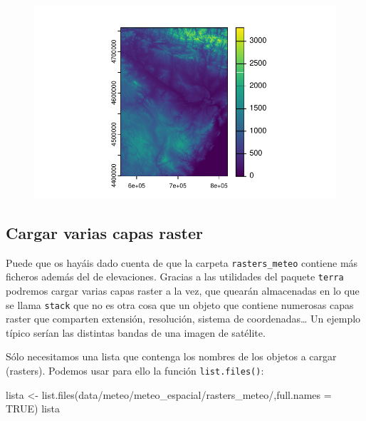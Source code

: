 \documentclass[
  letterpaper,
  DIV=11,
  numbers=noendperiod]{scrreprt}
\newenvironment{Shaded}{\begin{snugshade}}{\end{snugshade}}
\newcommand{\AttributeTok}[1]{\textcolor[rgb]{0.40,0.45,0.13}{#1}}
\newcommand{\ConstantTok}[1]{\textcolor[rgb]{0.56,0.35,0.01}{#1}}
\newcommand{\FunctionTok}[1]{\textcolor[rgb]{0.28,0.35,0.67}{#1}}
\newcommand{\NormalTok}[1]{\textcolor[rgb]{0.00,0.23,0.31}{#1}}
\newcommand{\OtherTok}[1]{\textcolor[rgb]{0.00,0.23,0.31}{#1}}
\newcommand{\StringTok}[1]{\textcolor[rgb]{0.13,0.47,0.30}{#1}}
\begin{document}
\begin{figure}[H]

{\centering \includegraphics{03_DatosEspaciales_files/figure-pdf/unnamed-chunk-25-1.pdf}

}

\end{figure}

\hypertarget{cargar-varias-capas-raster}{%
\subsection{Cargar varias capas
raster}\label{cargar-varias-capas-raster}}

Puede que os hayáis dado cuenta de que la carpeta
\texttt{rasters\_meteo} contiene más ficheros además del de elevaciones.
Gracias a las utilidades del paquete \texttt{terra} podremos cargar
varias capas raster a la vez, que quearán almacenadas en lo que se llama
\texttt{stack} que no es otra cosa que un objeto que contiene numerosas
capas raster que comparten extensión, resolución, sistema de
coordenadas\ldots{} Un ejemplo típico serían las distintas bandas de una
imagen de satélite.

Sólo necesitamos una lista que contenga los nombres de los objetos a
cargar (rasters). Podemos usar para ello la función
\texttt{list.files()}:

\begin{Shaded}
\begin{Highlighting}[]
\NormalTok{lista }\OtherTok{\textless{}{-}} \FunctionTok{list.files}\NormalTok{(}\StringTok{\textquotesingle{}data/meteo/meteo\_espacial/rasters\_meteo/\textquotesingle{}}\NormalTok{,}\AttributeTok{full.names =} \ConstantTok{TRUE}\NormalTok{)}
\NormalTok{lista}
\end{Highlighting}
\end{Shaded}
\end{document}
